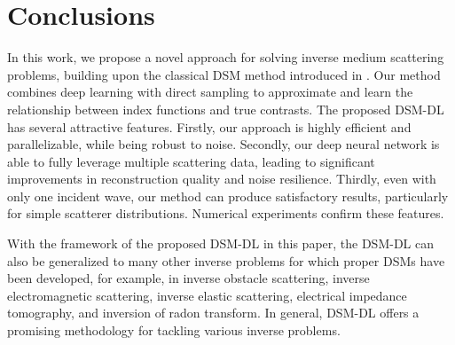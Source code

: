 \documentclass{article}
\begin{document}
     

	\section{Conclusions}\label{secConcl}
 In this work, we propose a novel approach for solving inverse medium scattering problems, building upon the classical DSM method introduced in \cite{ito2012direct}. Our method combines deep learning with direct sampling to approximate and learn the relationship between index functions and true contrasts. The proposed DSM-DL has several attractive features. Firstly, our approach is highly efficient and parallelizable, while being robust to noise. Secondly, our deep neural network is able to fully leverage multiple scattering data, leading to significant improvements in reconstruction quality and noise resilience. Thirdly, even with only one incident wave, our method can produce satisfactory results, particularly for simple scatterer distributions. Numerical experiments confirm these features.

	
With the framework of the proposed DSM-DL in this paper, the DSM-DL can also be generalized to many other inverse problems for which proper DSMs have been developed, for example, in inverse obstacle scattering, inverse electromagnetic scattering, inverse elastic scattering, electrical impedance tomography, and inversion of radon transform.  In general, DSM-DL offers a promising methodology for tackling various inverse problems. 

	
	
\end{document}

